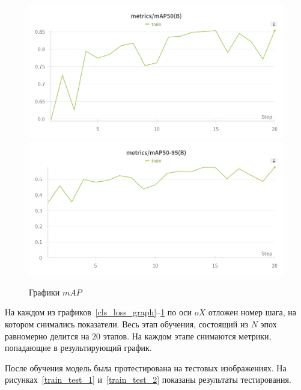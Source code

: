 \begin{figure}
    \includegraphics[scale=0.15]{img/train/map_50.png}
    \includegraphics[scale=0.15]{img/train/map50_95.png}
    \caption{Графики $mAP$}
    \label{map_graph}
\end{figure}

На каждом из графиков~\ref{cls_loss_graph}--\ref{map_graph} по оси $oX$ отложен номер шага, на котором снимались показатели. Весь этап обучения, состоящий из $N$ эпох равномерно делится на $20$ этапов. На каждом этапе снимаются метрики, попадающие в результирующий график.

После обучения модель была протестирована на тестовых изображениях. На рисунках~\ref{train_test_1} и~\ref{train_test_2} показаны результаты тестирования.

